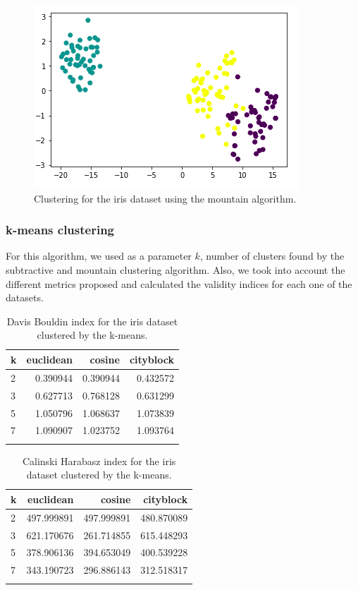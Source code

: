 \documentclass[conference]{IEEEtran}
\begin{document}
\begin{figure}[ht]
    \centering
    \includegraphics[scale = 0.45]{figures/iris/mountain.png}
    \caption{Clustering for the iris dataset using the mountain algorithm.}
    \label{fig:mon-iris}
\end{figure}

\subsubsection{k-means clustering}
For this algorithm, we used as a parameter $k$, number of clusters found by the subtractive and mountain clustering algorithm. Also, we took into account the different metrics proposed and calculated the validity indices for each one of the datasets.\\

\begin{table}[ht!]
    \centering
    \begin{tabular}{lrrr}
\toprule
k &  euclidean &    cosine &  cityblock \\
\midrule
2 &   0.390944 &  0.390944 &   0.432572 \\
3 &   0.627713 &  0.768128 &   0.631299 \\
5 &   1.050796 &  1.068637 &   1.073839 \\
7 &   1.090907 &  1.023752 &   1.093764 \\
\bottomrule \\
\end{tabular}
    \caption{Davis Bouldin index for the  iris dataset clustered by the k-means.}
        \label{tab:i1_db_km}
\end{table}

\begin{table}[ht!]
    \centering
    \begin{tabular}{lrrr}
\toprule
k &   euclidean &      cosine &   cityblock \\
\midrule
2 &  497.999891 &  497.999891 &  480.870089 \\
3 &  621.170676 &  261.714855 &  615.448293 \\
5 &  378.906136 &  394.653049 &  400.539228 \\
7 &  343.190723 &  296.886143 &  312.518317 \\
\bottomrule \\
\end{tabular}
   \caption{Calinski Harabasz index for the  iris dataset clustered by the k-means.}
    \label{tab:i1_ch_km}
\end{table}
\end{document}
